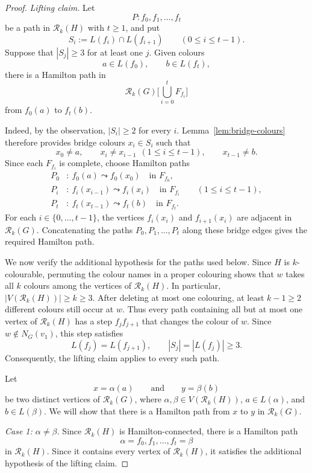 \documentclass[11pt]{article}
\theoremstyle{remark}
\newcommand{\Rk}{\mathcal R_k}
\numberwithin{equation}{section}
\begin{document}
\begin{proof}
\smallskip

\noindent\textit{Lifting claim.}
Let
\[
P:f_0,f_1,\dots,f_t
\]
be a path in $\Rk(H)$ with $t\ge1$, and put
\[
S_i:=L(f_i)\cap L(f_{i+1})\qquad(0\le i\le t-1).
\]
Suppose that $|S_j|\ge3$ for at least one $j$. Given colours
\[
a\in L(f_0),\qquad b\in L(f_t),
\]
there is a Hamilton path in
\[
\Rk(G)\bigg[\bigcup_{i=0}^t F_{f_i}\bigg]
\]
from $f_0(a)$ to $f_t(b)$.

Indeed, by the observation, $|S_i|\ge2$ for every $i$.
Lemma~\ref{lem:bridge-colours} therefore provides bridge colours
$x_i\in S_i$ such that
\[
x_0\neq a,\qquad x_i\neq x_{i-1}\ \ (1\leq i\leq t-1),\qquad x_{t-1}\neq b.
\]
Since each $F_{f_i}$ is complete, choose Hamilton paths
\begin{align*}
P_0&:\ f_0(a)\leadsto f_0(x_0)\quad \text{in }F_{f_0},\\
P_i&:\ f_i(x_{i-1})\leadsto f_i(x_i)\quad \text{in }F_{f_i}\qquad (1\leq i\leq t-1),\\
P_t&:\ f_t(x_{t-1})\leadsto f_t(b)\quad \text{in }F_{f_t}.
\end{align*}
For each $i\in\{0,\dots,t-1\}$, the vertices $f_i(x_i)$ and $f_{i+1}(x_i)$ are adjacent in $\Rk(G)$. Concatenating the paths $P_0,P_1,\dots,P_t$ along these bridge edges gives the required Hamilton path.

We now verify the additional hypothesis for the paths used below.
Since $H$ is $k$-colourable, permuting the colour names in a proper
colouring shows that $w$ takes all $k$ colours among the vertices of
$\Rk(H)$. In particular, $|V(\Rk(H))|\ge k\ge3$.
After deleting at most one colouring, at least $k-1\ge2$ different
colours still occur at $w$. Thus every path containing all but at most
one vertex of $\Rk(H)$ has a step $f_jf_{j+1}$ that changes
the colour of $w$. Since $w\notin N_G(v_1)$, this step satisfies
\[
L(f_j)=L(f_{j+1}),\qquad
|S_j|=|L(f_j)|\ge3.
\]
Consequently, the lifting claim applies to every such path.

Let
\[
x=\alpha(a)\qquad \text{and} \qquad y=\beta(b)
\]
be two distinct vertices of $\Rk(G)$, where $\alpha,\beta\in V(\Rk(H))$, $a\in L(\alpha)$, and $b\in L(\beta)$. 
We will show that there is a Hamilton path from $x$ to $y$ in $\Rk(G)$.

\smallskip

\noindent\textit{Case 1: $\alpha\neq \beta$.}
Since $\Rk(H)$ is Hamilton-connected, there is a Hamilton path
\[
\alpha=f_0,f_1,\dots,f_t=\beta
\]
in $\Rk(H)$. Since it contains every vertex of
$\Rk(H)$, it satisfies the additional hypothesis of the
lifting claim.


\end{proof}
\end{document}
